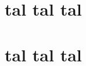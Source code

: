 \documentclass[12pt,twoside,openany]{report}     %
\begin{document}
\newpage

\appendix
\renewcommand{\appendixname}{Anexos}
\renewcommand{\appendixtocname}{Anexos}
\renewcommand{\appendixpagename}{Anexos}
\addappheadtotoc
\appendixpage
\chapter{tal tal tal}\label{aped.A}


\chapter{tal tal tal}\label{aped.B}

\end{document}
